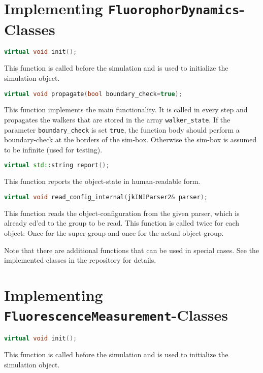 \documentclass[a4paper,twoside,10pt]{report}
\begin{document}
\section{Implementing \texttt{FluorophorDynamics}-Classes}
\label{sec:ImplementingTextttFluorophorDynamicsClasses}
\begin{lstlisting}[language=c++] 
	virtual void init();
\end{lstlisting}
This function is called before the simulation and is used to initialize the simulation object.


\begin{lstlisting}[language=c++] 
	virtual void propagate(bool boundary_check=true);
\end{lstlisting}	
This function implements the main functionality. It is called in every step and propagates the walkers that are stored in the array \texttt{walker\_state}. If the parameter \texttt{boundary\_check} is set \texttt{true}, the function body should perform a boundary-check at the borders of the sim-box. Otherwise the sim-box is assumed to be infinite (used for testing).

\begin{lstlisting}[language=c++] 
	virtual std::string report();
\end{lstlisting}	
This function reports the object-state in human-readable form.


\begin{lstlisting}[language=c++] 
	virtual void read_config_internal(jkINIParser2& parser);
\end{lstlisting}	
This function reads the object-configuration from the given parser, which is already cd'ed to the group to be read. This function is called twice for each object: Once for the super-group and once for the actual object-group.

Note that there are additional functions that can be used in special cases. See the implemented classes in the repository for details.

\section{Implementing \texttt{FluorescenceMeasurement}-Classes}
\label{sec:ImplementingTextttFluorescenceMeasurementClasses}
\begin{lstlisting}[language=c++] 
	virtual void init();
\end{lstlisting}
This function is called before the simulation and is used to initialize the simulation object.
\end{document}
